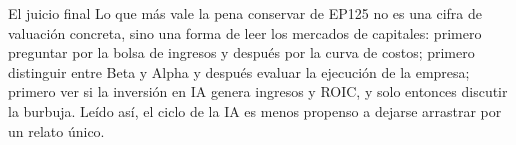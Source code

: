 \documentclass[a4paper]{article}
\begin{document}
\begin{importantbox}{El juicio final}
Lo que más vale la pena conservar de EP125 no es una cifra de valuación concreta, sino una forma de leer los mercados de capitales: primero preguntar por la bolsa de ingresos y después por la curva de costos; primero distinguir entre Beta y Alpha y después evaluar la ejecución de la empresa; primero ver si la inversión en IA genera ingresos y ROIC, y solo entonces discutir la burbuja. Leído así, el ciclo de la IA es menos propenso a dejarse arrastrar por un relato único.
\end{importantbox}
\end{document}
